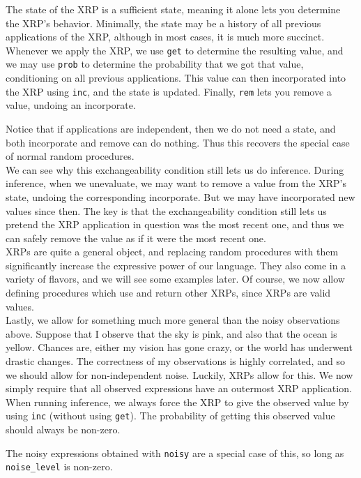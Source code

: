 \documentclass[11pt]{article}
\begin{document}
The state of the XRP is a sufficient state, meaning it alone lets you determine the XRP's behavior.  Minimally, the state may be a history of all previous applications of the XRP, although in most cases, it is much more succinct.  Whenever we apply the XRP, we use {\tt get} to determine the resulting value, and we may use {\tt prob} to determine the probability that we got that value, conditioning on all previous applications.  This value can then incorporated into the XRP using {\tt inc}, and the state is updated.  Finally, {\tt rem} lets you remove a value, undoing an incorporate.

Notice that if applications are independent, then we do not need a state, and both incorporate and remove can do nothing.  Thus this recovers the special case of normal random procedures.  \\

We can see why this exchangeability condition still lets us do inference.  During inference, when we unevaluate, we may want to remove a value from the XRP's state, undoing the corresponding incorporate.  But we may have incorporated new values since then.  The key is that the exchangeability condition still lets us pretend the XRP application in question was the most recent one, and thus we can safely remove the value as if it were the most recent one.  \\

XRPs are quite a general object, and replacing random procedures with them significantly increase the expressive power of our language.   They also come in a variety of flavors, and we will see some examples later.   Of course, we now allow defining procedures which use and return other XRPs, since XRPs are valid values.  \\

Lastly, we allow for something much more general than the noisy observations above.  Suppose that I observe that the sky is pink, and also that the ocean is yellow.  Chances are, either my vision has gone crazy, or the world has underwent drastic changes.  The correctness of my observations is highly correlated, and so we should allow for non-independent noise.  Luckily, XRPs allow for this.  We now simply require that all observed expressions have an outermost XRP application.  When running inference, we always force the XRP to give the observed value by using {\tt inc} (without using {\tt get}).  The probability of getting this observed value should always be non-zero.  

The noisy expressions obtained with {\tt noisy} are a special case of this, so long as {\tt noise\_level} is non-zero.  
\end{document}
